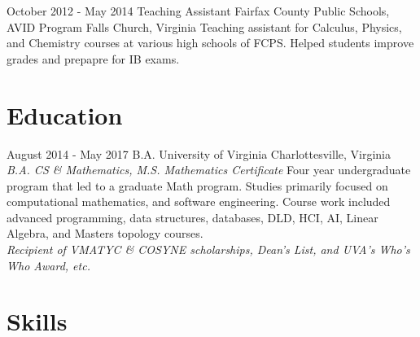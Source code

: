 \documentclass[11pt,a4paper,sans]{moderncv}        %
\begin{document}
\cventry
  {October 2012 - May 2014}
  {Teaching Assistant }
  {Fairfax County Public Schools, AVID Program}
  {Falls Church, Virginia}{}
  {Teaching assistant for Calculus, Physics, and Chemistry courses at various high schools of FCPS. Helped students improve grades and prepapre for IB exams. }


\section{Education}

\cventry
  {August 2014 - May 2017}
  {B.A.}
  {University of Virginia}
  {Charlottesville, Virginia}
  {\textit{B.A. CS \& Mathematics, M.S. Mathematics Certificate}}
  {Four year undergraduate program that led to a graduate Math program. Studies primarily focused on computational mathematics, and software engineering. Course work included advanced programming, data structures, databases, DLD, HCI, AI, Linear Algebra, and Masters topology courses. \\\textit{Recipient of VMATYC \& COSYNE scholarships, Dean's List, and UVA's Who's Who Award, etc.}}


\section{Skills}
\end{document}
